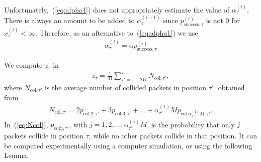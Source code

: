\documentclass[journal,onecolumn,12pt]{IEEEtran}
\begin{document}
Unfortunately,~(\ref{eq:alpha1}) does not appropriately estimate the value of $\alpha_{\tau}^{(i)}$. There is always an amount to be added to $\alpha_{\tau}^{(i-1)}$ since $p_{\text{success},\tau}^{(i)}$ is not 0 for $x_{\tau}^{(i)}<\infty$. Therefore, as an alternative to~(\ref{eq:alpha1}) we use 
\begin{align}
\alpha^{(i)}_{\tau} = \alpha p_{\text{success},\tau}^{(i)}\label{eq:alpha2}
\end{align}

We compute $z_{\tau}$ in
\begin{align}
z_{\tau} = \frac{1}{M}\sum_{\tau'=\tau-2W}^{\tau}N_{\textrm{col},\tau'}, 
\label{eq:ztau}
\end{align}
where $N_{\textrm{col},\tau'}$ is the average number of collided packets in position $\tau'$, obtained from
\begin{align}
N_{\textrm{col},\tau'} = 2p_{\textrm{col:2},\tau'}+3p_{\textrm{col:3},\tau'}+...+\alpha_{\tau'}^{(1)}Mp_{\textrm{col:}\alpha_{\tau'}^{(1)}M,\tau'}.
\label{eq:Ncol}
\end{align}
In~(\ref{eq:Ncol}), $p_{\textrm{col:j},\tau'}$, with $j=1,2,\dots,\alpha_{\tau'}^{(1)}M$, is the probability that only $j$ packets collide in position $\tau$, while no other packets collide in that position. It can be computed experimentally using a computer simulation, or using the following Lemma.
\end{document}
